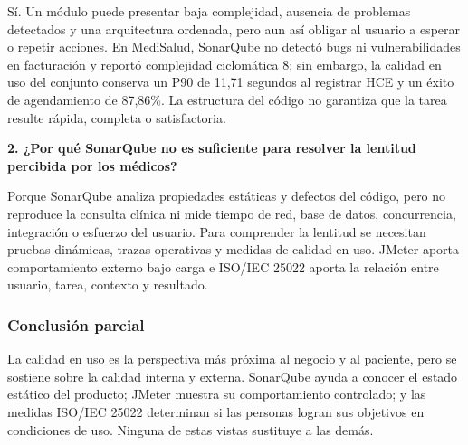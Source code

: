 Sí. Un módulo puede presentar baja complejidad, ausencia de problemas detectados y una arquitectura ordenada, pero aun así obligar al usuario a esperar o repetir acciones. En MediSalud, SonarQube no detectó bugs ni vulnerabilidades en facturación y reportó complejidad ciclomática 8; sin embargo, la calidad en uso del conjunto conserva un P90 de 11,71 segundos al registrar HCE y un éxito de agendamiento de 87,86\%. La estructura del código no garantiza que la tarea resulte rápida, completa o satisfactoria.

\textbf{2. ¿Por qué SonarQube no es suficiente para resolver la lentitud percibida por los médicos?}

Porque SonarQube analiza propiedades estáticas y defectos del código, pero no reproduce la consulta clínica ni mide tiempo de red, base de datos, concurrencia, integración o esfuerzo del usuario. Para comprender la lentitud se necesitan pruebas dinámicas, trazas operativas y medidas de calidad en uso. JMeter aporta comportamiento externo bajo carga e ISO/IEC 25022 aporta la relación entre usuario, tarea, contexto y resultado.

\subsubsection{Conclusión parcial}

La calidad en uso es la perspectiva más próxima al negocio y al paciente, pero se sostiene sobre la calidad interna y externa. SonarQube ayuda a conocer el estado estático del producto; JMeter muestra su comportamiento controlado; y las medidas ISO/IEC 25022 determinan si las personas logran sus objetivos en condiciones de uso. Ninguna de estas vistas sustituye a las demás.


